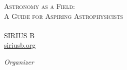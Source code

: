 \strut \vspace{20pt} %

\Huge{\textsc{Astronomy as a Field:}}\\ 
\Large{\textsc{A Guide for Aspiring Astrophysicists}}\\
\\
\Large{SIRIUS B}\\
\large{\href{https://siriusb.org}{siriusb.org}}

\vspace{40pt}
\Large{\emph{Organizer}}\\
\vspace{-10pt}
\normalsize

